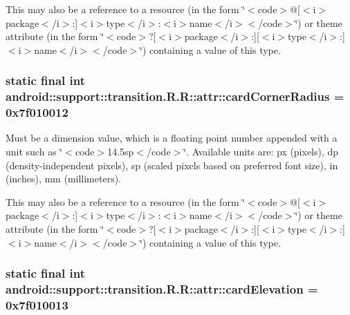 This may also be a reference to a resource (in the form \char`\"{}$<$code$>$@\mbox{[}$<$i$>$package$<$/i$>$:\mbox{]}$<$i$>$type$<$/i$>$:$<$i$>$name$<$/i$>$$<$/code$>$\char`\"{}) or theme attribute (in the form \char`\"{}$<$code$>$?\mbox{[}$<$i$>$package$<$/i$>$:\mbox{]}\mbox{[}$<$i$>$type$<$/i$>$:\mbox{]}$<$i$>$name$<$/i$>$$<$/code$>$\char`\"{}) containing a value of this type. \hypertarget{classandroid_1_1support_1_1transition_1_1_r_1_1attr_ed1a59be4ea3b67c605a6c3562dde793}{
\subsubsection[{cardCornerRadius}]{\setlength{\rightskip}{0pt plus 5cm}static final int android::support::transition.R.R::attr::cardCornerRadius = 0x7f010012}}
\label{classandroid_1_1support_1_1transition_1_1_r_1_1attr_ed1a59be4ea3b67c605a6c3562dde793}


Must be a dimension value, which is a floating point number appended with a unit such as \char`\"{}$<$code$>$14.5sp$<$/code$>$\char`\"{}. Available units are: px (pixels), dp (density-independent pixels), sp (scaled pixels based on preferred font size), in (inches), mm (millimeters). 

This may also be a reference to a resource (in the form \char`\"{}$<$code$>$@\mbox{[}$<$i$>$package$<$/i$>$:\mbox{]}$<$i$>$type$<$/i$>$:$<$i$>$name$<$/i$>$$<$/code$>$\char`\"{}) or theme attribute (in the form \char`\"{}$<$code$>$?\mbox{[}$<$i$>$package$<$/i$>$:\mbox{]}\mbox{[}$<$i$>$type$<$/i$>$:\mbox{]}$<$i$>$name$<$/i$>$$<$/code$>$\char`\"{}) containing a value of this type. \hypertarget{classandroid_1_1support_1_1transition_1_1_r_1_1attr_867fc59da849cfba7c96f7b4332c2797}{
\subsubsection[{cardElevation}]{\setlength{\rightskip}{0pt plus 5cm}static final int android::support::transition.R.R::attr::cardElevation = 0x7f010013}}
\label{classandroid_1_1support_1_1transition_1_1_r_1_1attr_867fc59da849cfba7c96f7b4332c2797}


